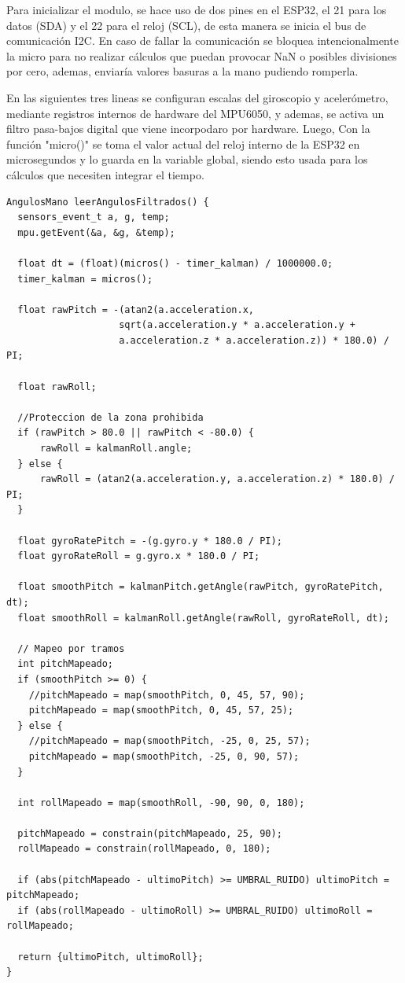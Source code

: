 \documentclass[10pt]{article}
\begin{document}
Para inicializar el modulo, se hace uso de dos pines en el ESP32, el 21 para los datos (SDA) y el 22 para el reloj (SCL), de esta manera se inicia el bus de comunicación I2C. En caso de fallar la comunicación se bloquea intencionalmente la micro para no realizar cálculos que puedan provocar NaN o posibles divisiones por cero, ademas, enviaría valores basuras a la mano pudiendo romperla.

En las siguientes tres lineas se configuran escalas del giroscopio y acelerómetro, mediante registros internos de hardware del MPU6050, y ademas, se activa un filtro pasa-bajos digital que viene incorpodaro por hardware. Luego, Con la función "micro()" se toma el valor actual del reloj interno de la ESP32 en microsegundos y lo guarda en la variable global, siendo esto usada para los cálculos que necesiten integrar el tiempo. 

\begin{lstlisting}
AngulosMano leerAngulosFiltrados() {
  sensors_event_t a, g, temp;
  mpu.getEvent(&a, &g, &temp);

  float dt = (float)(micros() - timer_kalman) / 1000000.0;
  timer_kalman = micros();

  float rawPitch = -(atan2(a.acceleration.x, 
                    sqrt(a.acceleration.y * a.acceleration.y + 
                    a.acceleration.z * a.acceleration.z)) * 180.0) / PI;
  
  float rawRoll;

  //Proteccion de la zona prohibida
  if (rawPitch > 80.0 || rawPitch < -80.0) {
      rawRoll = kalmanRoll.angle; 
  } else {
      rawRoll = (atan2(a.acceleration.y, a.acceleration.z) * 180.0) / PI;
  }

  float gyroRatePitch = -(g.gyro.y * 180.0 / PI); 
  float gyroRateRoll = g.gyro.x * 180.0 / PI;

  float smoothPitch = kalmanPitch.getAngle(rawPitch, gyroRatePitch, dt);
  float smoothRoll = kalmanRoll.getAngle(rawRoll, gyroRateRoll, dt);

  // Mapeo por tramos
  int pitchMapeado;
  if (smoothPitch >= 0) {
    //pitchMapeado = map(smoothPitch, 0, 45, 57, 90);
    pitchMapeado = map(smoothPitch, 0, 45, 57, 25);
  } else {
    //pitchMapeado = map(smoothPitch, -25, 0, 25, 57);
    pitchMapeado = map(smoothPitch, -25, 0, 90, 57);
  }

  int rollMapeado = map(smoothRoll, -90, 90, 0, 180);

  pitchMapeado = constrain(pitchMapeado, 25, 90);
  rollMapeado = constrain(rollMapeado, 0, 180);

  if (abs(pitchMapeado - ultimoPitch) >= UMBRAL_RUIDO) ultimoPitch = pitchMapeado;
  if (abs(rollMapeado - ultimoRoll) >= UMBRAL_RUIDO) ultimoRoll = rollMapeado;

  return {ultimoPitch, ultimoRoll};
}
\end{lstlisting}
\end{document}
